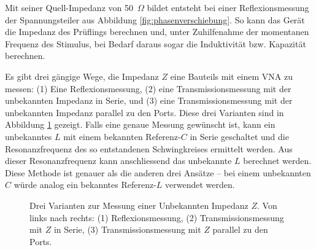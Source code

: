\documentclass[twoside,a4paper,11pt,halfparskip,DIV=11,notitlepage]{scrartcl}
\newcommand{\Ohm}{$\Omega$\xspace}
\begin{document}
Mit seiner Quell-Impedanz von 50~\Ohm bildet entsteht bei einer
Reflexionsmessung der Spannungsteiler aus Abbildung
\ref{fig:phasenverschiebung}. So kann das Gerät die Impedanz des Prüflings
berechnen und, unter Zuhilfenahme der momentanen Frequenz des Stimulus, bei
Bedarf daraus sogar die Induktivität bzw. Kapazität berechnen.

Es gibt drei gängige Wege, die Impedanz $Z$ eine Bauteils mit einem VNA zu messen:
(1) Eine Reflexionsmessung, (2) eine Transmissionsmessung mit der unbekannten
Impedanz in Serie, und (3) eine Transmissionsmessung mit der unbekannten
Impedanz parallel zu den Ports. Diese drei Varianten sind in Abbildung
\ref{fig:impedancemeasurement} gezeigt. Falls eine genaue Messung gewünscht ist,
kann ein unbekanntes $L$ mit einem bekannten Referenz-$C$ in Serie geschaltet
und die Resonanzfrequenz des so entstandenen Schwingkreises ermittelt werden.
Aus dieser Resonanzfrequenz kann anschliessend das unbekannte $L$ berechnet werden.
Diese Methode ist genauer als die anderen drei Ansätze -- bei einem unbekannten
$C$ würde analog ein bekanntes Referenz-$L$ verwendet werden.

\begin{figure}[H]
    \hfill
    \hfill
     \caption{Drei Varianten zur Messung einer Unbekannten Impedanz $Z$. Von
         links nach rechts: (1) Reflexionsmessung, (2) Transmissionsmessung mit $Z$ in
     Serie, (3) Transmissionsmessung mit $Z$ parallel zu den Ports.}
    \label{fig:impedancemeasurement}
\end{figure}
\end{document}
